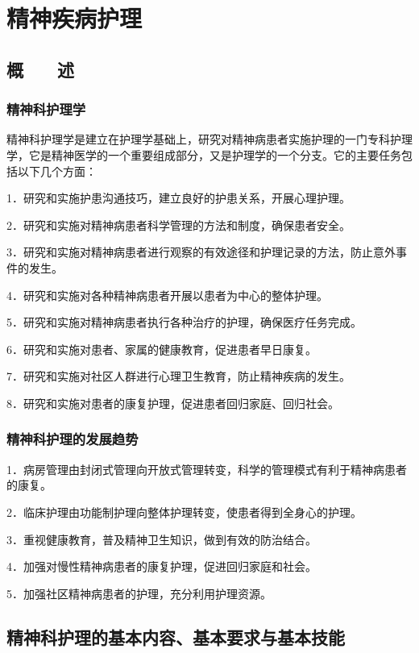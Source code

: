 \chapter{精神疾病护理}

\section{概　　述}

\subsection{精神科护理学}

精神科护理学是建立在护理学基础上，研究对精神病患者实施护理的一门专科护理学，它是精神医学的一个重要组成部分，又是护理学的一个分支。它的主要任务包括以下几个方面：

1．研究和实施护患沟通技巧，建立良好的护患关系，开展心理护理。

2．研究和实施对精神病患者科学管理的方法和制度，确保患者安全。

3．研究和实施对精神病患者进行观察的有效途径和护理记录的方法，防止意外事件的发生。

4．研究和实施对各种精神病患者开展以患者为中心的整体护理。

5．研究和实施对精神病患者执行各种治疗的护理，确保医疗任务完成。

6．研究和实施对患者、家属的健康教育，促进患者早日康复。

7．研究和实施对社区人群进行心理卫生教育，防止精神疾病的发生。

8．研究和实施对患者的康复护理，促进患者回归家庭、回归社会。

\subsection{精神科护理的发展趋势}

1．病房管理由封闭式管理向开放式管理转变，科学的管理模式有利于精神病患者的康复。

2．临床护理由功能制护理向整体护理转变，使患者得到全身心的护理。

3．重视健康教育，普及精神卫生知识，做到有效的防治结合。

4．加强对慢性精神病患者的康复护理，促进回归家庭和社会。

5．加强社区精神病患者的护理，充分利用护理资源。

\section{精神科护理的基本内容、基本要求与基本技能}

